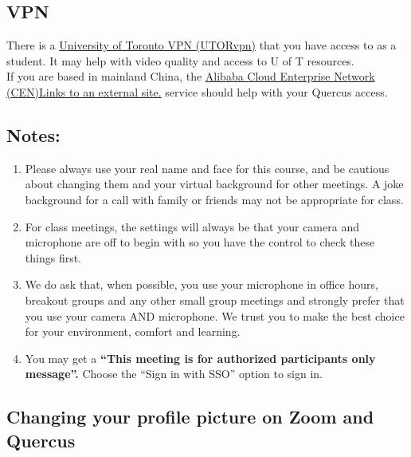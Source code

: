 \documentclass[
  openany]{book}
\begin{document}
\hypertarget{vpn}{%
\subsection{VPN}\label{vpn}}

There is a \href{https://isea.utoronto.ca/services/vpn/utorvpn/}{University of Toronto VPN (UTORvpn)} that you have access to as a student. It may help with video quality and access to U of T resources.\\
If you are based in mainland China, the \href{https://onesearch.library.utoronto.ca/ic-faq-categories/alibaba-cloud-enterprise-network-cen-service}{Alibaba Cloud Enterprise Network (CEN)Links to an external site.} service should help with your Quercus access.

\hypertarget{notes}{%
\subsection{Notes:}\label{notes}}

\begin{enumerate}
\def\labelenumi{\arabic{enumi}.}
\item
  Please always use your real name and face for this course, and be cautious about changing them and your virtual background for other meetings. A joke background for a call with family or friends may not be appropriate for class.
\item
  For class meetings, the settings will always be that your camera and microphone are off to begin with so you have the control to check these things first.
\item
  We do ask that, when possible, you use your microphone in office hours, breakout groups and any other small group meetings and strongly prefer that you use your camera AND microphone. We trust you to make the best choice for your environment, comfort and learning.
\item
  You may get a \textbf{``This meeting is for authorized participants only message''.} Choose the ``Sign in with SSO'' option to sign in.
\end{enumerate}

\hypertarget{changing-your-profile-picture-on-zoom-and-quercus}{%
\subsection{Changing your profile picture on Zoom and Quercus}\label{changing-your-profile-picture-on-zoom-and-quercus}}
\end{document}
